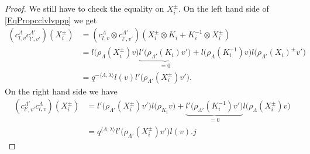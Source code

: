 \begin{proof}
    We still have to check the equality on \( X_i^{\pm}\). On the left hand side of \eqref{EqPropcclvlvppp} we get
    \begin{subequations}
        \begin{align}
            (c_{l,v}^{\Lambda}c^{\Lambda'}_{l',v'})(X_i^{\pm})&=(c_{l,v}^{\Lambda}\otimes c^{\Lambda'}_{l',v'})(X_i^{\pm}\otimes K_i+K_i^{-1}\otimes X_i^{\pm})\\
            &=l\big( \rho_{\Lambda}(X_i^{\pm})v \big)\underbrace{l'\big( \rho_{\Lambda'}(K_i)v' \big)}_{=0}+l\big( \rho_{\Lambda}(K_i^{-1})v \big)l\big( \rho_{\Lambda'}(X_i)^{\pm}v' \big)\\
            &=q^{-\langle \Lambda, \lambda\rangle }l(v)l'\big( \rho_{\Lambda'}(X_i^{\pm})v' \big).
        \end{align}
    \end{subequations}
    On the right hand side we have
    \begin{subequations}
        \begin{align}
            (c_{l',v'}^{\Lambda'}c_{l,v}^{\Lambda})(X_i^{\pm})&=l'\big( \rho_{\Lambda'}(X_i^{\pm})v' \big)l\big( \rho_{K_i}v \big)+
            \underbrace{l'\big( \rho_{\Lambda'}(K_i^{-1})v' \big)}_{=0} l\big( \rho_{\Lambda}(X_i^{\pm})v \big)\\
            &=q^{\langle \Lambda, \lambda\rangle }l'\big( \rho_{\Lambda'}(X_i^{\pm})v' \big)l(v).j
        \end{align}
    \end{subequations}
\end{proof}
